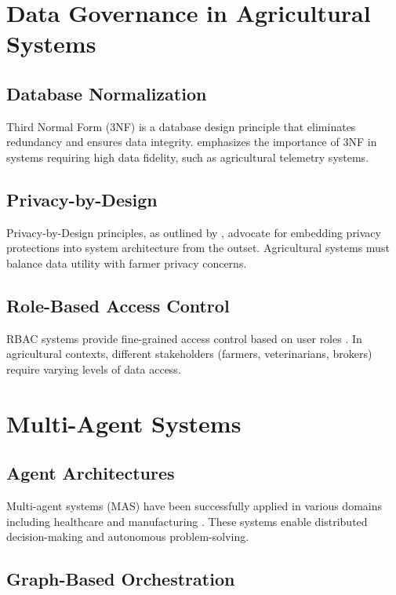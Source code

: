 \section{Data Governance in Agricultural Systems}

\subsection{Database Normalization}

Third Normal Form (3NF) is a database design principle that eliminates redundancy and ensures data integrity. \cite{date2003database} emphasizes the importance of 3NF in systems requiring high data fidelity, such as agricultural telemetry systems.

\subsection{Privacy-by-Design}

Privacy-by-Design principles, as outlined by \cite{cavoukian2011privacy}, advocate for embedding privacy protections into system architecture from the outset. Agricultural systems must balance data utility with farmer privacy concerns.

\subsection{Role-Based Access Control}

RBAC systems provide fine-grained access control based on user roles \cite{sandhu1996role}. In agricultural contexts, different stakeholders (farmers, veterinarians, brokers) require varying levels of data access.

\section{Multi-Agent Systems}

\subsection{Agent Architectures}

Multi-agent systems (MAS) have been successfully applied in various domains including healthcare \cite{wooldridge2009introduction} and manufacturing \cite{jennings1998agent}. These systems enable distributed decision-making and autonomous problem-solving.

\subsection{Graph-Based Orchestration}

